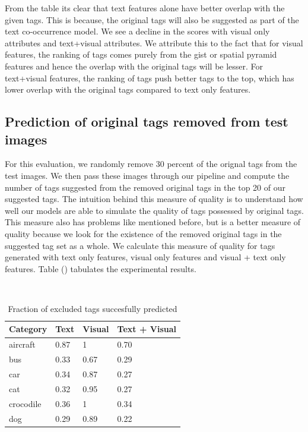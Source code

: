 \documentclass[12pt]{article}
\begin{document}
From the table its clear that text features alone have better overlap with the given tags.
This is because, the original tags will also be suggested as part of the text co-occurrence
model. We see a decline in the scores with visual only attributes and text+visual attributes.
We attribute this to the fact that for visual features, the ranking of tags comes purely from
the gist or spatial pyramid features and hence the overlap with the original tags will be lesser.
For text+visual features, the ranking of tags push better tags to the top, which has lower overlap
with the original tags compared to text only features.

\subsection{Prediction of original tags removed from test images}
For this evaluation, we randomly remove 30 percent of the orignal tags from the test images. We
then pass these images through our pipeline and compute the number of tags suggested from the
removed original tags in the top 20 of our suggested tags. The intuition behind this measure of
quality is to understand how well our models are able to simulate the quality of tags possessed
by original tags. This measure also has problems like mentioned before, but is a better measure
of quality because we look for the existence of the removed original tags in the suggested tag
set as a whole. We calculate this measure of quality for tags generated with text only features,
visual only features and visual + text only features. Table () tabulates the experimental results.

\begin{table}
   \caption{Fraction of excluded tags succesfully predicted}
\begin{center}
    \begin{tabular}{|l l l l|}
\hline
Category & Text & Visual & Text + Visual \\
\hline
aircraft & 0.87 & 1 & 0.70 \\
bus  & 0.33 & 0.67 & 0.29 \\
car &  0.34 & 0.87 & 0.27 \\
cat &  0.32 & 0.95 & 0.27 \\
crocodile &  0.36 & 1 & 0.34 \\
dog  & 0.29 & 0.89 & 0.22 \\
\hline
\end{tabular}
\end{center}
\end{table}
\end{document}
